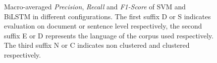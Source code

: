 \begin{figure}[!ht]
        \captionsetup{justification=justified,margin=1cm}
    \caption{Macro-averaged \textit{Precision}, \textit{Recall} and \textit{F1-Score} of \gls{SVM} and \gls{BiLSTM} in different configurations. The first suffix D or S indicates evaluation on document or sentence level respectively, the second suffix E or D represents the language of the corpus used respectively. The third suffix N or C indicates non clustered and clustered respectively.}
    \label{fig:question1EvalMacro}
\end{figure}


